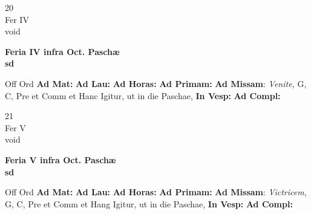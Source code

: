 \documentclass[10pt, openany]{book}
\begin{document}
    \begin{center}
        \begin{minipage}{3.5in}
            \vspace{2em}
            \begin{minipage}{0.5in}
                {\Huge 20} \\
                {\normalsize Fer IV} \\
                {\normalsize void}
            \end{minipage}
            \begin{minipage}{3.0in}
                \textbf{ \large Feria IV infra Oct. Paschæ \\
                \textnormal{\normalsize sd}} \\ 
            \end{minipage}
            \begin{justify}Off Ord
                \textbf{Ad Mat: }
                \textbf{Ad Lau: }
                \textbf{Ad Horas: }
                \textbf{Ad Primam: }\textbf{Ad Missam}: \textit{Venite,} G, C, Pre et Comm et Hanc Igitur, ut in die Paschae,  
                \textbf{In Vesp: }
                \textbf{Ad Compl: }
            \end{justify}
        \end{minipage}
    \end{center}

    \begin{center}
        \begin{minipage}{3.5in}
            \vspace{2em}
            \begin{minipage}{0.5in}
                {\Huge 21} \\
                {\normalsize Fer V} \\
                {\normalsize void}
            \end{minipage}
            \begin{minipage}{3.0in}
                \textbf{ \large Feria V infra Oct. Paschæ \\
                \textnormal{\normalsize sd}} \\ 
            \end{minipage}
            \begin{justify}Off Ord
                \textbf{Ad Mat: }
                \textbf{Ad Lau: }
                \textbf{Ad Horas: }
                \textbf{Ad Primam: }\textbf{Ad Missam}: \textit{Victricem,} G, C, Pre et Comm et Hang Igitur, ut in die Paschae,  
                \textbf{In Vesp: }
                \textbf{Ad Compl: }
            \end{justify}
        \end{minipage}
    \end{center}
\end{document}
